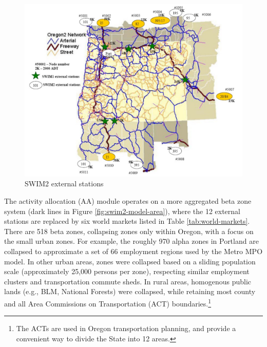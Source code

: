 \begin{figure}[!t]
\centering
\includegraphics[width=6.25in]{overview/external-stations}
\caption{SWIM2 external stations}
\label{fig:swim2-external-stations}
\end{figure}
 
The activity allocation (AA) module operates on a more aggregated beta zone system (dark lines in Figure \ref{fig:swim2-model-area}), where the 12 external stations are replaced by six world markets listed in Table \ref{tab:world-markets}. There are 518 beta zones, collapsing zones only within Oregon, with a focus on the small urban zones. For example, the roughly 970 alpha zones in Portland are collapsed to approximate a set of 66 employment regions used by the Metro MPO model. In other urban areas, zones were collapsed based on a sliding population scale (approximately 25,000 persons per zone), respecting similar employment clusters and transportation commute sheds. In rural areas, homogenous public lands (e.g., BLM, National Forests) were collapsed, while retaining most county and all Area Commissions on Transportation (ACT) boundaries.\footnote{The ACTs are used in Oregon transportation planning, and provide a convenient way to divide the State into 12 areas.}

